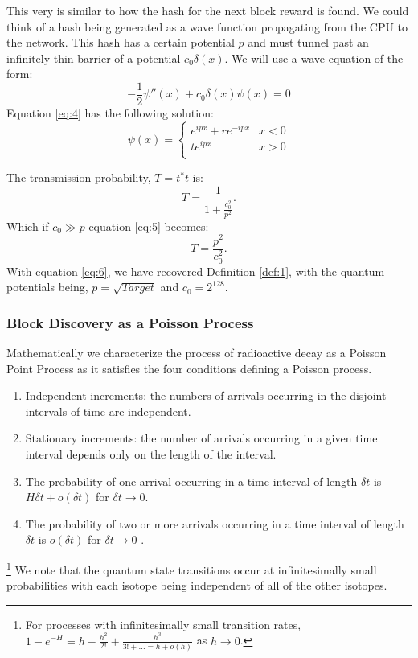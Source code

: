 \documentclass[runningheads]{llncs}
\begin{document}
This very is similar to how the hash for the next block reward is found.
We could think of a hash being generated as a wave function propagating from the CPU to the network.
This hash has a certain potential $p$ and must tunnel past an infinitely thin barrier of a potential $c_0 \delta(x)$.
We will use a wave equation of the form:
\begin{equation}
    -\frac{1}{2}\psi''(x) + c_0 \delta(x) \psi(x) = 0 \label{eq:4}
\end{equation}
Equation \ref{eq:4} has the following solution:
\begin{equation}
    \psi(x) =\left\{
    \begin{array}{ll}
        e^{i p x} + r e^{-i p x} & x < 0 \\
        t e^{i p x} & x > 0 \\
    \end{array}
    \right.
\end{equation}

The transmission probability, $T = t^*t$ is:
\begin{equation}
    T = \frac{1}{1+\frac{c_0^2}{p^2}}. \label{eq:5}
\end{equation}
Which if $c_0 \gg p$ equation \ref{eq:5} becomes:
\begin{equation}
    T = \frac{p^2}{c_0^2}. \label{eq:6}
\end{equation}
With equation \ref{eq:6}, we have recovered Definition \ref{def:1}, with the quantum potentials being, $p = \sqrt{Target}$ and $c_0 = 2^{128}$.

\subsubsection{Block Discovery as a Poisson Process}
Mathematically we characterize the process of radioactive decay as a Poisson Point Process as it satisfies the four conditions defining a Poisson process.
\begin{enumerate}
    \item Independent increments: the numbers of arrivals occurring in the disjoint intervals of time are independent.
    \item Stationary increments: the number of arrivals occurring in a given time interval depends only on the length of the interval.
    \item The probability of one arrival occurring in a time interval of length $\delta t$ is $H \delta t + o(\delta t)$ for $\delta t \rightarrow 0$.
    \item The probability of two or more arrivals occurring in a time interval of length $\delta t$ is $o(\delta t)$ for $\delta t \rightarrow 0$ \cite{tijms2003first}.
\end{enumerate}
\footnote{For processes with infinitesimally small transition rates, $1 - e^{-H} = h - \frac{h^2}{2!} + \frac{h^3}{3! + \ldots = h + o(h)}$ as $h \rightarrow 0$\cite{tijms2003first}.}
We note that the quantum state transitions occur at infinitesimally small probabilities with each isotope being independent of all of the other isotopes.
\end{document}
